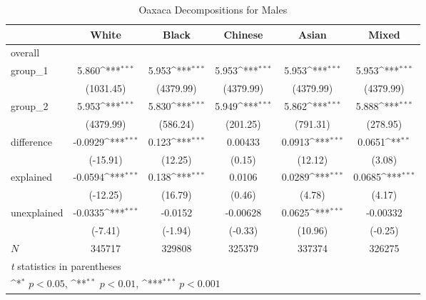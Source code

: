 \begin{table}[htbp]\centering
\def\sym#1{\ifmmode^{#1}\else\(^{#1}\)\fi}
\caption{Oaxaca Decompositions for Males\label{tab1}}
\begin{tabular}{l*{5}{c}}
\hline\hline
            &\multicolumn{1}{c}{White}&\multicolumn{1}{c}{Black}&\multicolumn{1}{c}{Chinese}&\multicolumn{1}{c}{Asian}&\multicolumn{1}{c}{Mixed}\\
\hline
overall     &                     &                     &                     &                     &                     \\
group\_1     &       5.860\sym{***}&       5.953\sym{***}&       5.953\sym{***}&       5.953\sym{***}&       5.953\sym{***}\\
            &   (1031.45)         &   (4379.99)         &   (4379.99)         &   (4379.99)         &   (4379.99)         \\
group\_2     &       5.953\sym{***}&       5.830\sym{***}&       5.949\sym{***}&       5.862\sym{***}&       5.888\sym{***}\\
            &   (4379.99)         &    (586.24)         &    (201.25)         &    (791.31)         &    (278.95)         \\
difference  &     -0.0929\sym{***}&       0.123\sym{***}&     0.00433         &      0.0913\sym{***}&      0.0651\sym{**} \\
            &    (-15.91)         &     (12.25)         &      (0.15)         &     (12.12)         &      (3.08)         \\
explained   &     -0.0594\sym{***}&       0.138\sym{***}&      0.0106         &      0.0289\sym{***}&      0.0685\sym{***}\\
            &    (-12.25)         &     (16.79)         &      (0.46)         &      (4.78)         &      (4.17)         \\
unexplained &     -0.0335\sym{***}&     -0.0152         &    -0.00628         &      0.0625\sym{***}&    -0.00332         \\
            &     (-7.41)         &     (-1.94)         &     (-0.33)         &     (10.96)         &     (-0.25)         \\
\hline
\(N\)       &      345717         &      329808         &      325379         &      337374         &      326275         \\
\hline\hline
\multicolumn{6}{l}{\footnotesize \textit{t} statistics in parentheses}\\
\multicolumn{6}{l}{\footnotesize \sym{*} \(p<0.05\), \sym{**} \(p<0.01\), \sym{***} \(p<0.001\)}\\
\end{tabular}
\label{tab:oaxaca_male_summary}
\end{table}
